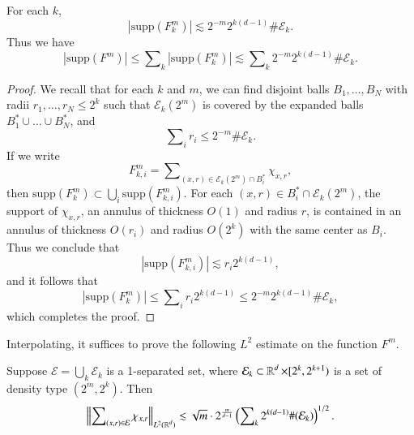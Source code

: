 \begin{lemma} \label{lemma5}
    For each $k$,
    \[ |\text{supp}(F^m_k)| \lesssim 2^{-m} 2^{k(d-1)} \# \mathcal{E}_k. \]
    Thus we have
    \[ |\text{supp}(F^m)| \leq \sum\nolimits_k |\text{supp}(F^m_k)| \lesssim \sum\nolimits_k 2^{-m} 2^{k(d-1)} \# \mathcal{E}_k. \]
\end{lemma}
\begin{proof}
    We recall that for each $k$ and $m$, we can find disjoint balls $B_1,\dots,B_N$ with radii $r_1,\dots,r_N \leq 2^k$ such that $\mathcal{E}_k(2^m)$ is covered by the expanded balls $B_1^* \cup \dots \cup B_N^*$, and
    \begin{equation}
      \sum\nolimits_i r_i \leq 2^{-m} \# \mathcal{E}_k.
    \end{equation}
    If we write
    \begin{equation}
      F^m_{k,i} = \sum\nolimits_{(x,r) \in \mathcal{E}_k(2^m) \cap B_i^*} \chi_{x,r},
    \end{equation}
    then $\text{supp}(F^m_k) \subset \bigcup_i \text{supp}(F^m_{k,i})$. For each $(x,r) \in B_i^* \cap \mathcal{E}_k(2^m)$, the support of $\chi_{x,r}$, an annulus of thickness $O(1)$ and radius $r$, is contained in an annulus of thickness $O(r_i)$ and radius $O(2^k)$ with the same center as $B_i$. Thus we conclude that
    \begin{equation}
      |\text{supp}(F^m_{k,i})| \lesssim r_i 2^{k(d-1)},
    \end{equation}
    and it follows that
    \begin{equation}
      |\text{supp}(F^m_k)| \leq \sum\nolimits_i r_i 2^{k(d-1)} \leq 2^{-m} 2^{k(d-1)} \# \mathcal{E}_k,
    \end{equation}
    which completes the proof.
\end{proof}

Interpolating, it suffices to prove the following $L^2$ estimate on the function $F^m$.

\begin{lemma} \label{lemma6}
    Suppose $\mathcal{E} = \bigcup_k \mathcal{E}_k$ is a 1-separated set, where $\mathcal{E}_k \subset \operatorname{\mathbb{R}}^d \times [2^k,2^{k+1})$ is a set of density type $(2^m, 2^k)$. Then
    \[ \left\| \sum\nolimits_{(x,r) \in \mathcal{E}} \chi_{x,r} \right\|_{L^2(\operatorname{\mathbb{R}}^d)} \lesssim \sqrt{m} \cdot 2^{ \frac{m}{d-1} } \left( \sum\nolimits_k 2^{k(d-1)} \#(\mathcal{E}_k) \right)^{1/2}. \]
\end{lemma}

